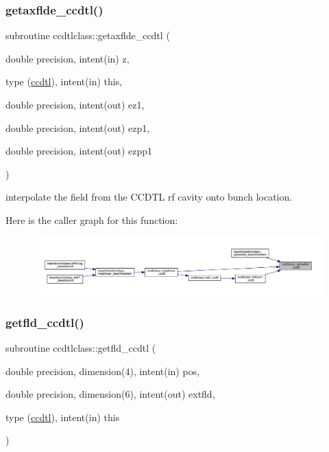 \mbox{\label{namespaceccdtlclass_adb7b1c30d3fcb087a5064911ccd4fd1d}} 
\subsubsection{\texorpdfstring{getaxflde\_ccdtl()}{getaxflde\_ccdtl()}}
{\footnotesize\ttfamily subroutine ccdtlclass\+::getaxflde\+\_\+ccdtl (\begin{DoxyParamCaption}\item[{double precision, intent(in)}]{z,  }\item[{type (\mbox{\hyperlink{namespaceccdtlclass_structccdtlclass_1_1ccdtl}{ccdtl}}), intent(in)}]{this,  }\item[{double precision, intent(out)}]{ez1,  }\item[{double precision, intent(out)}]{ezp1,  }\item[{double precision, intent(out)}]{ezpp1 }\end{DoxyParamCaption})}



interpolate the field from the C\+C\+D\+TL rf cavity onto bunch location. 

Here is the caller graph for this function\+:\nopagebreak
\begin{figure}[H]
\begin{center}
\leavevmode
\includegraphics[width=350pt]{namespaceccdtlclass_adb7b1c30d3fcb087a5064911ccd4fd1d_icgraph}
\end{center}
\end{figure}
\mbox{\label{namespaceccdtlclass_a62eb43f6a732d52951d468e91a2312cb}} 
\subsubsection{\texorpdfstring{getfld\_ccdtl()}{getfld\_ccdtl()}}
{\footnotesize\ttfamily subroutine ccdtlclass\+::getfld\+\_\+ccdtl (\begin{DoxyParamCaption}\item[{double precision, dimension(4), intent(in)}]{pos,  }\item[{double precision, dimension(6), intent(out)}]{extfld,  }\item[{type (\mbox{\hyperlink{namespaceccdtlclass_structccdtlclass_1_1ccdtl}{ccdtl}}), intent(in)}]{this }\end{DoxyParamCaption})}



